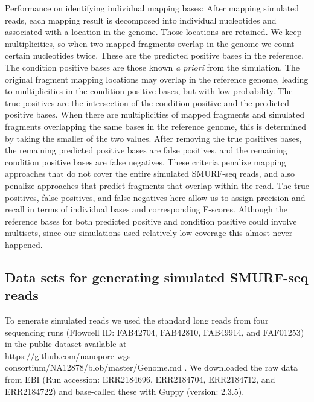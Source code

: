 Performance on identifying individual mapping bases: After mapping
simulated reads, each mapping result is decomposed into individual
nucleotides and associated with a location in the genome. Those
locations are retained. We keep multiplicities, so when two mapped
fragments overlap in the genome we count certain nucleotides twice.
These are the predicted positive bases in the reference.  The condition
positive bases are those known \textit{a priori} from the simulation.
The original fragment mapping locations may overlap in the reference
genome, leading to multiplicities in the condition positive bases, but
with low probability. The true positives are the intersection of the
condition positive and the predicted positive bases. When there are
multiplicities of mapped fragments and simulated fragments overlapping
the same bases in the reference genome, this is determined by taking the
smaller of the two values. After removing the true positives bases, the
remaining predicted positive bases are false positives, and the
remaining condition positive bases are false negatives. These criteria
penalize mapping approaches that do not cover the entire simulated
SMURF-seq reads, and also penalize approaches that predict fragments
that overlap within the read. The true positives, false positives, and
false negatives here allow us to assign precision and recall in terms of
individual bases and corresponding F-scores. Although the reference
bases for both predicted positive and condition positive could involve
multisets, since our simulations used relatively low coverage this
almost never happened.


\subsection{Data sets for generating simulated SMURF-seq reads}
To generate simulated reads we used the standard long reads from four
sequencing runs (Flowcell ID: FAB42704, FAB42810, FAB49914, and
FAF01253) in the public dataset available at \\
https://github.com/nanopore-wgs-consortium/NA12878/blob/master/Genome.md
\citep{jain2018nanopore,jain2018nanopore_git}. We downloaded the raw data
from EBI (Run accession: ERR2184696, ERR2184704, ERR2184712, and
ERR2184722) and base-called these with Guppy (version: 2.3.5).


